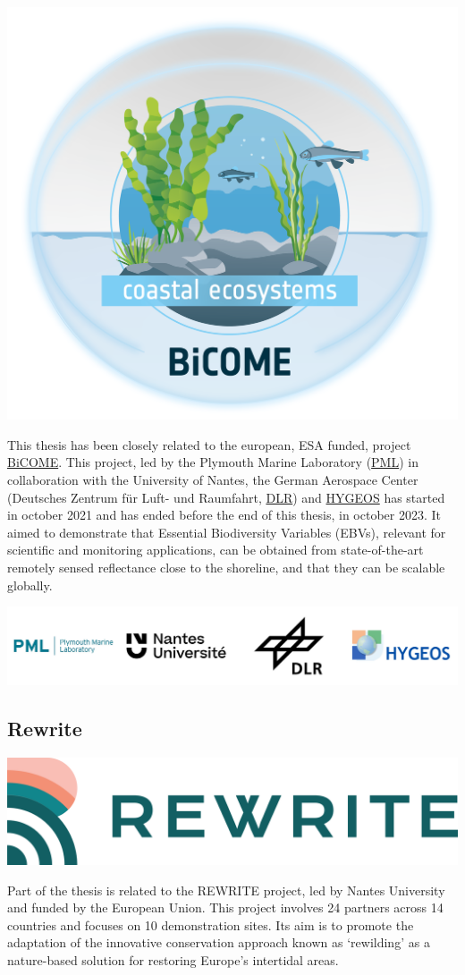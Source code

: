 \documentclass[
  letterpaper,
  11pt,
  english,
  singlespacing,
  headsepline]{MastersDoctoralThesis}
\begin{document}
\begin{center}
\includegraphics[width=0.4\linewidth,height=\textheight,keepaspectratio]{images/BiCOME Logo.png}
\end{center}
This thesis has been closely related to the european, ESA funded,
project \href{https://bicome.info}{BiCOME}. This project, led by the
Plymouth Marine Laboratory (\href{https://pml.ac.uk}{PML}) in
collaboration with the University of Nantes, the German Aerospace Center
(Deutsches Zentrum für Luft- und Raumfahrt,
\href{https://www.dlr.de/en}{DLR}) and
\href{https://hygeos.com/en/}{HYGEOS} has started in october 2021 and
has ended before the end of this thesis, in october 2023. It aimed to
demonstrate that Essential Biodiversity Variables (EBVs), relevant for
scientific and monitoring applications, can be obtained from
state-of-the-art remotely sensed reflectance close to the shoreline, and
that they can be scalable globally.

\begin{center}
\includegraphics[width=1\linewidth,height=\textheight,keepaspectratio]{images/logos_BICOME.png}
\end{center}

\subsection*{Rewrite}\label{rewrite}

\begin{center}
\includegraphics[width=0.4\linewidth,height=\textheight,keepaspectratio]{images/rewrite-logo.png}
\end{center}
Part of the thesis is related to the REWRITE project, led by Nantes
University and funded by the European Union. This project involves 24
partners across 14 countries and focuses on 10 demonstration sites. Its
aim is to promote the adaptation of the innovative conservation approach
known as `rewilding' as a nature-based solution for restoring Europe's
intertidal areas.
\end{document}
